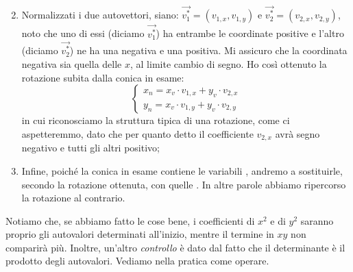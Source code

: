 \documentclass[a4paper, oneside]{article}
\begin{document}
\begin{enumerate}
\begin{equation*}
			\end{equation*}
			\item Normalizzati i due autovettori, siano: $\overrightarrow{v_1^{*}}=(v_{1,x},v_{1,y})$ e $\overrightarrow{v_2^{*}}=(v_{2,x},v_{2,y})$, noto che uno di essi (diciamo $\overrightarrow{v_1^{*}}$) ha entrambe le coordinate positive e l'altro (diciamo $\overrightarrow{v_2^{*}}$) ne ha una negativa e una positiva. Mi assicuro che la coordinata negativa sia quella delle $x$, al limite cambio di segno. Ho così ottenuto la rotazione subita dalla conica in esame:
			\begin{equation*}
				\left\{
				\begin{array}{c}
					x_n = x_v\cdot v_{1,x} + y_v\cdot v_{2,x} \\
					y_n = x_v\cdot v_{1,y} + y_v\cdot v_{2,y}
				\end{array} \right.
			\end{equation*}
			in cui riconosciamo la struttura tipica di una rotazione, come ci aspetteremmo, dato che per quanto detto il coefficiente $v_{2,x}$ avrà segno negativo e tutti gli altri positivo;
			\item Infine, poiché la conica in esame contiene le variabili , andremo a sostituirle, secondo la rotazione ottenuta, con quelle . In altre parole abbiamo ripercorso la rotazione al contrario.
		\end{enumerate}
		Notiamo che, se abbiamo fatto le cose bene, i coefficienti di $x^2$ e di $y^2$ saranno proprio gli autovalori determinati all'inizio, mentre il termine in $xy$ non comparirà più. Inoltre, un'altro \emph{controllo} è dato dal fatto che il determinante è il prodotto degli autovalori. Vediamo nella pratica come operare.
		
		\newpage
\end{document}
